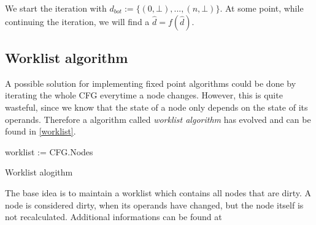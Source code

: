 We start the iteration with $d_{bot} := \{(0,\bot), ..., (n, \bot)\}$. At some point, while continuing the iteration, we will find a $\hat{d} = f(\hat{d})$. 


\subsection{Worklist algorithm}

A possible solution for implementing fixed point algorithms could be done by iterating the whole CFG everytime a node changes. However, this is quite wasteful, since we know that the state of a node only depends on the state of its operands. Therefore a algorithm called \textit{worklist algorithm} has evolved and can be found in \autoref{worklist}.

\begin{algorithm}[H]
	worklist := {CFG.Nodes}\;
	\caption{Worklist alogithm}
	\label{worklist}
\end{algorithm}

The base idea is to maintain a worklist which contains all nodes that are dirty. A node is considered dirty, when its operands have changed, but the node itself is not recalculated. Additional informations can be found at \cite{iterative-data-flow-analysis-revisited}
